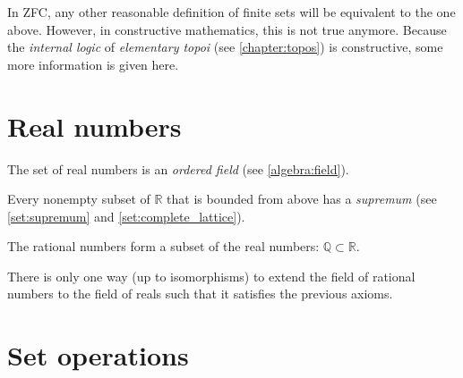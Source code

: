     In ZFC, any other reasonable definition of finite sets will be equivalent to the one above. However, in constructive mathematics, this is not true anymore. Because the \textit{internal logic} of \textit{elementary topoi} (see \cref{chapter:topos}) is constructive, some more information is given here.



\section{Real numbers}

    \begin{axiom}[Ordering]
        The set of real numbers is an \textit{ordered field} (see \cref{algebra:field}).
    \end{axiom}
    \begin{axiom}\label{set:dedekind_completeness}
        Every nonempty subset of $\mathbb{R}$ that is bounded from above has a \textit{supremum} (see \cref{set:supremum} and \cref{set:complete_lattice}).
    \end{axiom}

    \begin{axiom}
        The rational numbers form a subset of the real numbers: $\mathbb{Q}\subset\mathbb{R}$.
    \end{axiom}

    \begin{remark}
        There is only one way (up to isomorphisms) to extend the field of rational numbers to the field of reals such that it satisfies the previous axioms.
    \end{remark}


\section{Set operations}

